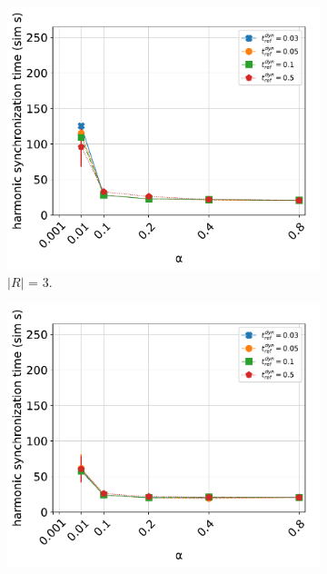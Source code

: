 	\begin{figure}[ht!]
	  \begin{subfigure}[b]{0.5\textwidth}
		\centering\captionsetup{width=.9\linewidth}%
		\includegraphics[width=\textwidth]{Assets/DocSegments/Chapters/ExperimentsAndResults/Figures/PerfScores/t_ref_dyn_x_alpha_hyperparamtuning_experiment_plot_collsize3.pdf}
		\caption{$|R|$ = 3.}
		\label{fig:sub:t_ref_dyn_x_alpha_collsize3}
	  \end{subfigure}
	  \begin{subfigure}[b]{0.5\textwidth}
		\centering\captionsetup{width=.9\linewidth}%
		\includegraphics[width=\textwidth]{Assets/DocSegments/Chapters/ExperimentsAndResults/Figures/PerfScores/t_ref_dyn_x_alpha_hyperparamtuning_experiment_plot_collsize10.pdf}

\end{subfigure}
\end{figure}
